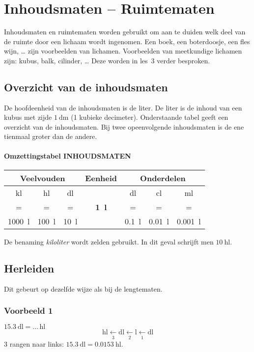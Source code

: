 \documentclass[a4paper,12pt]{article}
\begin{document}
\section{Inhoudsmaten -- Ruimtematen}
Inhoudsmaten en ruimtematen worden gebruikt om aan te duiden welk deel van de ruimte door een lichaam wordt ingenomen. Een boek, een boterdoosje, een fles wijn, \dots{} zijn voorbeelden van lichamen. Voorbeelden van meetkundige lichamen zijn: kubus, balk, cilinder, \dots{} Deze worden in les~3 verder besproken.

\subsection{Overzicht van de inhoudsmaten}
De hoofdeenheid van de inhoudsmaten is de liter. De liter is de inhoud van een kubus met zijde \(\SI{1}{\deci\metre}\) (1 kubieke decimeter). Onderstaande tabel geeft een overzicht van de inhoudsmaten. Bij twee opeenvolgende inhoudsmaten is de ene tienmaal groter dan de andere.

\paragraph{Omzettingstabel INHOUDSMATEN}
\renewcommand{\arraystretch}{1.2}
\begin{center}
\setlength{\fboxsep}{4pt}\setlength{\fboxrule}{0.5pt}%
\begin{tabular}{*{7}{c}}
  \multicolumn{3}{c}{\textbf{Veelvouden}} & \textbf{Eenheid} & \multicolumn{3}{c}{\textbf{Onderdelen}}\\
  \midrule
\si{\kilo\litre} & \si{\hecto\litre} & \si{\deca\litre} &  & \si{\deci\litre} & \si{\centi\litre} & \si{\milli\litre}\\
= & = & = & \textbf{\SI{1}{\litre}} & = & = & =\\
\SI{1000}{\litre} & \SI{100}{\litre} & \SI{10}{\litre} & & \SI{0.1}{\litre} & \SI{0.01}{\litre} & \SI{0.001}{\litre}
\end{tabular}
\end{center}

De benaming \emph{kiloliter} wordt zelden gebruikt. In dit geval schrijft men \(\SI{10}{\hecto\litre}\).

\subsection{Herleiden}
Dit gebeurt op dezelfde wijze als bij de lengtematen.

\subsubsection*{Voorbeeld 1}
\(\SI{15.3}{\deci\litre}=\ldots\,\si{\hecto\litre}\)\\
\[
\si{\hecto\litre} \xleftarrow[3]{}\si{\deca\litre} \xleftarrow[2]{}\si{\litre} \xleftarrow[1]{}\si{\deci\litre}
\]
3 rangen naar links: \(\SI{15.3}{\deci\litre}=\SI{0.0153}{\hecto\litre}\).
\end{document}
